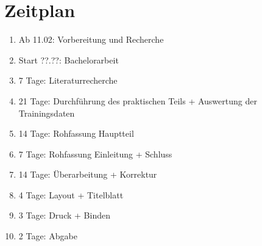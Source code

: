 \documentclass[a4paper,12pt,oneside]{article}
\begin{document}
  
  \section{Zeitplan}  
  
  \begin{enumerate}
  \item Ab 11.02:     	Vorbereitung und Recherche
  \item Start ??.??: 	Bachelorarbeit
  \item 7 Tage: 		Literaturrecherche
  \item 21 Tage: 		Durchführung des praktischen Teils + Auswertung der Trainingsdaten
  \item 14 Tage:		Rohfassung Hauptteil
  \item 7 Tage:		Rohfassung Einleitung + Schluss
  \item 14 Tage:		Überarbeitung + Korrektur
  \item 4 Tage:		Layout + Titelblatt
  \item 3 Tage:		Druck + Binden
  \item 2 Tage:		Abgabe
  \end{enumerate}
  
  \newpage
  
  \printbibliography
  
\end{document}
